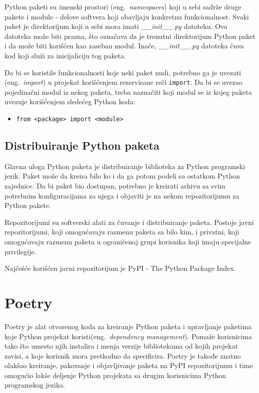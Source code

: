 \documentclass[12pt]{report}
\begin{document}
Python paketi su imenski prostori (eng.\ \textit{namespaces}) koji u sebi sadrže druge pakete i module - delove softvera koji obavljaju konkretnu funkcionalnost. Svaki paket je direktorijum koji u sebi mora imati \textit{\_\_init\_\_.py} datoteku. Ova datoteka može biti prazna, što označava da je trenutni direktorijum Python paket i da može biti korišćen kao zaseban modul. Inače, \textit{\_\_init\_\_.py} datoteka čuva kod koji služi za inicijaliciju tog paketa.

Da bi se koristile funkcionalnosti koje neki paket nudi, potrebno ga je uvezati (eng.\ \textit{import}) u projekat korišćenjem rezervisane reči \texttt{import}. Da bi se uvezao pojedinačni modul iz nekog paketa, treba naznačiti koji modul se iz kojeg paketa uvezuje korišćenjem sledećeg Python koda:

\begin{itemize}
    \item \texttt{from <package> import <module>}
\end{itemize}

\subsection{Distribuiranje Python paketa}

Glavna uloga Python paketa je distribuiranje biblioteka za Python programski jezik. Paket može da kreira bilo ko i da ga potom podeli sa ostatkom Python zajednice. Da bi paket bio dostupan, potrebno je kreirati arhivu sa svim potrebnim konfiguracijama za njega i objaviti je na nekom repozitorijumu za Python pakete.

Repozitorijumi su softverski alati za čuvanje i distribuiranje paketa. Postoje javni repozitorijumi, koji omogućavaju razmenu paketa sa bilo kim, i privatni, koji omogućavaju razmenu paketa u ograničenoj grupi korisnika koji imaju specijalne privilegije.

Najčešće korišćen javni repozitorijum je PyPI \cite{pypi}  - The Python Package Index.

\section{Poetry}
Poetry \cite{poetry} je alat otvorenog koda za kreiranje Python paketa i upravljanje paketima koje Python projekat koristi(eng.\ \textit{dependency management}). Pomaže korisnicima tako što umesto njih instalira i menja verzije  bibliotekama od kojih projekat zavisi, a koje korisnik mora pretkodno da specificira. Poetry je takođe znatno olakšao kreiranje, pakovanje i objavljivanje paketa na PyPI repozitorijumu i time omogućio lakše deljenje Python projekata sa drugim korisnicima Python programskog jezika.
\end{document}
